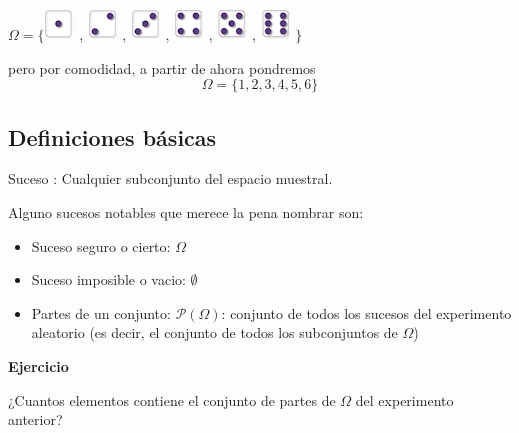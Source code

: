 \documentclass[]{book}
\providecommand{\tightlist}{%
  \setlength{\itemsep}{0pt}\setlength{\parskip}{0pt}}
\begin{document}
\(\Omega=\Big\{\)\includegraphics{Images/proba1dibujos/dice/1.png} ,
\includegraphics{Images/proba1dibujos/dice/2.png} ,
\includegraphics{Images/proba1dibujos/dice/3.png} ,
\includegraphics{Images/proba1dibujos/dice/4.png} ,
\includegraphics{Images/proba1dibujos/dice/5.png} ,
\includegraphics{Images/proba1dibujos/dice/6.png} \(\Big\}\)

pero por comodidad, a partir de ahora pondremos
\[\Omega = \{1,2,3,4,5,6\}\]

\hypertarget{definiciones-buxe1sicas-1}{%
\subsection{Definiciones básicas}\label{definiciones-buxe1sicas-1}}

 Suceso : Cualquier subconjunto del espacio muestral.

Alguno sucesos notables que merece la pena nombrar son:

\begin{itemize}
\tightlist
\item
  Suceso seguro o cierto: \(\Omega\)
\item
  Suceso imposible o vacio: \(\emptyset\)
\item
  Partes de un conjunto: \(\mathcal{P}(\Omega)\): conjunto de todos los sucesos del experimento aleatorio (es decir, el conjunto de todos los subconjuntos de \(\Omega\))
\end{itemize}

\textbf{Ejercicio}

¿Cuantos elementos contiene el conjunto de partes de \(\Omega\) del experimento anterior?
\end{document}
